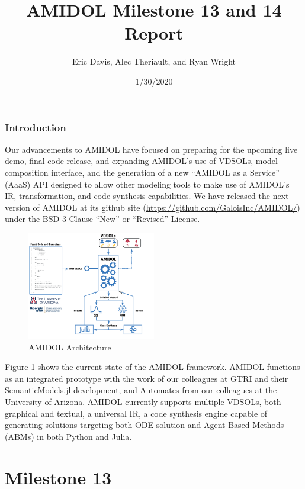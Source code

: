 \documentclass[12pt]{galois-whitepaper}
\author{Eric Davis, Alec Theriault, and Ryan Wright}
\title{AMIDOL Milestone 13 and 14 Report}
\date{1/30/2020}
\begin{document}
\maketitle

\vspace*{2cm}
\tableofcontents

\section{Introduction}

Our advancements to AMIDOL have focused on preparing for the upcoming
live demo, final code release, and expanding AMIDOL's use of VDSOLs,
model composition interface, and the generation of a new ``AMIDOL as a
Service'' (AaaS) API designed to allow other modeling tools to make
use of AMIDOL's IR, transformation, and code synthesis capabilities.
We have released the next version of AMIDOL at its github site
(\url{https://github.com/GaloisInc/AMIDOL/}) under the BSD 3-Clause
``New'' or ``Revised'' License.

\begin{figure}
  \centering
  \includegraphics[width=0.5\textwidth]{figs/AMIDOL-architecture.png}
  \caption{AMIDOL Architecture}
  \label{Fig:Arch} 
\end{figure}

Figure \ref{Fig:Arch} shows the current state of the AMIDOL
framework.  AMIDOL functions as an integrated prototype with the work
of our colleagues at GTRI and their SemanticModels.jl development, and
Automates from our colleagues at the University of Arizona.  AMIDOL
currently supports multiple VDSOLs, both graphical and textual, a
universal IR, a code synthesis engine capable of generating solutions
targeting both ODE solution and Agent-Based Methods (ABMs) in both
Python and Julia.

\part{Milestone 13}
\end{document}
